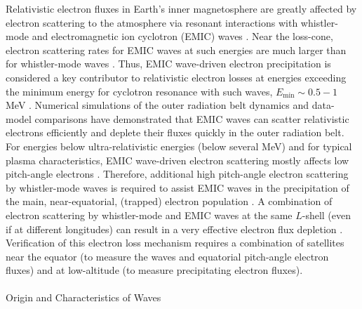 \documentclass[
  letterpaper,
  DIV=11,
  numbers=noendperiod]{scrartcl}
\makeatletter
\let\oldparagraph\paragraph
\renewcommand{\paragraph}{
    \@ifstar
      \xxxParagraphStar
      \xxxParagraphNoStar
  }
\newcommand{\xxxParagraphStar}[1]{\oldparagraph*{#1}\mbox{}}
\newcommand{\xxxParagraphNoStar}[1]{\oldparagraph{#1}\mbox{}}
\makeatother
\begin{document}
Relativistic electron fluxes in Earth's inner magnetosphere are greatly affected by electron scattering to the atmosphere via resonant interactions with whistler-mode and electromagnetic ion cyclotron (EMIC) waves \citep{millanReviewRadiationBelt2007, summersTimescalesRadiationBelt2007a}. Near the loss-cone, electron scattering rates for EMIC waves at such energies are much larger than for whistler-mode waves \citep{glauertCalculationPitchAngle2005}. Thus, EMIC wave-driven electron precipitation is considered a key contributor to relativistic electron losses at energies exceeding the minimum energy for cyclotron resonance with such waves, \(E_{\min}\sim 0.5-1\) MeV \citep{summersRelativisticElectronPitchangle2003, summersTimescalesRadiationBelt2007}. Numerical simulations of the outer radiation belt dynamics \citep{maModelingInwardDiffusion2015} and data-model comparisons \citep{angelopoulosEnergeticElectronPrecipitation2023} have demonstrated that EMIC waves can scatter relativistic electrons efficiently and deplete their fluxes quickly in the outer radiation belt.
For energies below ultra-relativistic energies (below several MeV) and for typical plasma characteristics, EMIC wave-driven electron scattering mostly affects low pitch-angle electrons \citep[equatorial \(\alpha_{eq}<30^\circ\), see][]{kerstenElectronLossesRadiation2014}. Therefore, additional high pitch-angle electron scattering by whistler-mode waves is required to assist EMIC waves in the precipitation of the main, near-equatorial, (trapped) electron population \citep{mourenasFastDropoutsMultiMeV2016}. A combination of electron scattering by whistler-mode and EMIC waves at the same \(L\)-shell (even if at different longitudes) can result in a very effective electron flux depletion \citep{mourenasFastDropoutsMultiMeV2016, drozdovDepletionsMultiMeVElectrons2022}. Verification of this electron loss mechanism requires a combination of satellites near the equator (to measure the waves and equatorial pitch-angle electron fluxes) and at low-altitude (to measure precipitating electron fluxes).

\paragraph{Origin and Characteristics of Waves}\label{origin-and-characteristics-of-waves}
\end{document}
